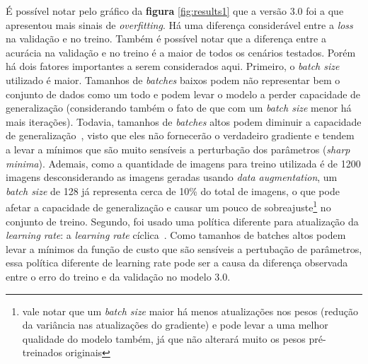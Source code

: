 \documentclass{bmvc2k}
\begin{document}
É possível notar pelo gráfico da \textbf{figura} \ref{fig:results1} que a versão 3.0 foi a que apresentou mais sinais de \textit{overfitting}. Há uma diferença considerável entre a \textit{loss} na validação e no treino. Também é possível notar que a diferença entre a acurácia na validação e no treino é a maior de todos os cenários testados. Porém há dois fatores importantes a serem considerados aqui. Primeiro, o \textit{batch size} utilizado é maior. Tamanhos de \textit{batches} baixos podem não representar bem o conjunto de dados como um todo e podem levar o modelo a perder capacidade de generalização (considerando também o fato de que com um \textit{batch size} menor há mais iterações). Todavia, tamanhos de \textit{batches} altos podem diminuir a capacidade de generalização~\cite{batch}, visto que eles não fornecerão o verdadeiro gradiente e tendem a levar a mínimos que são muito sensíveis a perturbação dos parâmetros (\textit{sharp minima}). Ademais, como a quantidade de imagens para treino utilizada é de 1200 imagens desconsiderando as imagens geradas usando \textit{data augmentation}, um \textit{batch size} de 128 já representa cerca de 10\% do total de imagens, o que pode afetar a capacidade de generalização e causar um pouco de sobreajuste\footnote{vale notar que um \textit{batch size} maior há menos atualizações nos pesos (redução da variância nas atualizações do gradiente) e pode levar a uma melhor qualidade do modelo também, já que não alterará muito os pesos pré-treinados originais} no conjunto de treino. Segundo, foi usado uma política diferente para atualização da \textit{learning rate}: a \textit{learning rate} cíclica~\cite{cyclical}. Como tamanhos de batches altos podem levar a mínimos da função de custo que são sensíveis a pertubação de parâmetros, essa política diferente de learning rate pode ser a causa da diferença observada entre o erro do treino e da validação no modelo 3.0.
\end{document}
